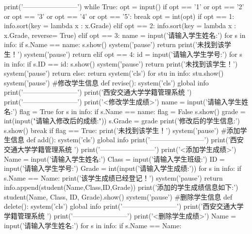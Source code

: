 \documentclass{article}
\begin{document}
\begin{python}
        print('------------------------')
        while True:
            opt = input()
            if opt == '1' or opt == '2' or opt == '3' or opt == '4' or opt == '5':
                break
        opt = int(opt)
        if opt == 1:
            info.sort(key = lambda x : x.Grade)
        elif opt == 2:
            info.sort(key = lambda x : x.Grade, reverse= True)
        elif opt == 3:
            name = input('请输入学生姓名:')
            for s in info:
                if s.Name == name:
                    s.show()
                    system('pause')
                    return
            print('未找到该学生！')
            system('pause')
            return
        elif opt == 4:
            id = input('请输入学生学号:')
            for s in info:
                if s.ID == id:
                    s.show()
                    system('pause')
                    return
            print('未找到该学生！')
            system('pause')
            return
        else:
            return
        system('cls')
        for stu in info:
            stu.show()
        system('pause')
#修改学生信息
def revise():
    system('cls')
    global info
    print('------------------------')
    print('西安交通大学学籍管理系统     ')
    print('------------------------')
    print('<修改学生成绩>')
    name = input('请输入学生姓名:')
    flag = True
    for s in info:
        if s.Name == name:
            flag = False
            s.show()
            grade = int(input("请输入修改后的成绩:"))
            s.Grade = grade
            print('修改后的学生信息:')
            s.show()
            break
    if flag == True:
        print('未找到该学生！')
    system('pause')
#添加学生信息
def add():
    system('cls')
    global info
    print('------------------------')
    print('西安交通大学学籍管理系统     ')
    print('------------------------')
    print('<添加学生成绩>')
    Name = input('请输入学生姓名:')
    Class = input('请输入学生班级:')
    ID = input('请输入学生学号:')
    Grade = int(input('请输入学生成绩:'))
    for s in info:
        if s.Name == Name:
            print('该学生成绩已经登记！')
            system('pause')
            return
    info.append(student(Name,Class,ID,Grade))
    print('添加的学生成绩信息如下:')
    student(Name, Class, ID, Grade).show()
    system('pause')
#删除学生信息
def delete():
    system('cls')
    global info
    print('------------------------')
    print('西安交通大学学籍管理系统     ')
    print('------------------------')
    print('<删除学生成绩>')
    Name = input('请输入学生姓名:')
    for s in info:
        if s.Name == Name:

\end{python}
\end{document}
